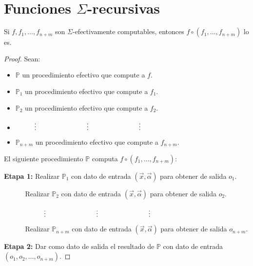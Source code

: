 \section{Funciones $\Sigma$-recursivas}

  \begin{lemma}
    \PN Si $f, f_{1}, \dotsc, f_{n+m}$ son $\Sigma$-efectivamente computables, entonces $f \circ (f_{1}, \dotsc,
    f_{n+m})$ lo es.
  \end{lemma}
  \begin{proof}
    \PN Sean:

    \begin{itemize}
      \item $\mathbb{P}$ un procedimiento efectivo que compute a $f$.
      \item $\mathbb{P}_{1}$ un procedimiento efectivo que compute a $f_{1}$.
      \item $\mathbb{P}_{2}$ un procedimiento efectivo que compute a $f_{2}$.
      \item $\vdotswithin{(n-1)m+1} \qquad \vdotswithin{(n-1)m+2} \qquad \vdotswithin{(n-1)m+r}$
      \item $\mathbb{P}_{n+m}$ un procedimiento efectivo que compute a $f_{n+m}$.
    \end{itemize}

    \PN El siguiente procedimiento $\mathbb{P}$ computa $f \circ (f_{1}, \dotsc, f_{n+m})$:

    \vspace{3mm}
    \PN \textbf{Etapa 1:}
    Realizar $\mathbb{P}_{1}$ con dato de entrada $(\vec{x}, \vec{\alpha})$ para obtener de salida $o_{1}$.

    $\qquad\;\;\;\;$Realizar $\mathbb{P}_{2}$ con dato de entrada $(\vec{x}, \vec{\alpha})$ para obtener de salida
    $o_{2}$.

    $\qquad\;\;\;\;\vdotswithin{(n-1)m+1} \qquad \vdotswithin{(n-1)m+2} \qquad \vdotswithin{(n-1)m+r}$

    $\qquad\;\;\;\;$Realizar $\mathbb{P}_{n+m}$ con dato de entrada $(\vec{x}, \vec{\alpha})$ para obtener de salida
    $o_{n+m}$.

    \PN \textbf{Etapa 2:}
    Dar como dato de salida el resultado de $\mathbb{P}$ con dato de entrada $(o_{1}, o_{2}, \dotsc, o_{n+m})$.
  \end{proof}

